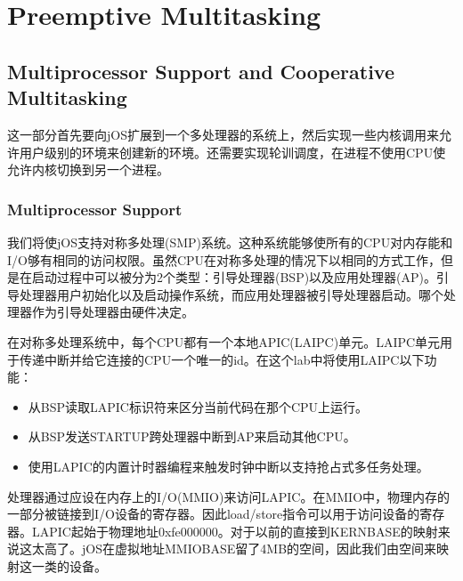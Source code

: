 \chapter{Preemptive Multitasking}
\label{cha:preemptive_multitasking}

\section{Multiprocessor Support and Cooperative Multitasking}
\par 这一部分首先要向jOS扩展到一个多处理器的系统上，然后实现一些内核调用来允许用户级别的环境来创建新的环境。还需要实现轮训调度，在进程不使用CPU使允许内核切换到另一个进程。

\subsection{Multiprocessor Support}
\par 我们将使jOS支持对称多处理(SMP)系统。这种系统能够使所有的CPU对内存能和I/O够有相同的访问权限。虽然CPU在对称多处理的情况下以相同的方式工作，但是在启动过程中可以被分为2个类型：引导处理器(BSP)以及应用处理器(AP)。引导处理器用户初始化以及启动操作系统，而应用处理器被引导处理器启动。哪个处理器作为引导处理器由硬件决定。
\par 在对称多处理系统中，每个CPU都有一个本地APIC(LAIPC)单元。LAIPC单元用于传递中断并给它连接的CPU一个唯一的id。在这个lab中将使用LAIPC以下功能：
\begin{itemize}
    \item 从BSP读取LAPIC标识符来区分当前代码在那个CPU上运行。
    \item 从BSP发送STARTUP跨处理器中断到AP来启动其他CPU。
    \item 使用LAPIC的内置计时器编程来触发时钟中断以支持抢占式多任务处理。
\end{itemize}
\par 处理器通过应设在内存上的I/O(MMIO)来访问LAPIC。在MMIO中，物理内存的一部分被链接到I/O设备的寄存器。因此load/store指令可以用于访问设备的寄存器。LAPIC起始于物理地址0xfe000000。对于以前的直接到KERNBASE的映射来说这太高了。jOS在虚拟地址MMIOBASE留了4MB的空间，因此我们由空间来映射这一类的设备。

